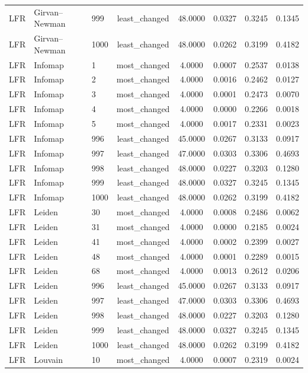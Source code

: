 \begin{longtable}{lllccccc}
LFR & Girvan--Newman & 999 & least\_changed & 48.0000 & 0.0327 & 0.3245 & 0.1345 \\
LFR & Girvan--Newman & 1000 & least\_changed & 48.0000 & 0.0262 & 0.3199 & 0.4182 \\
LFR & Infomap & 1 & most\_changed & 4.0000 & 0.0007 & 0.2537 & 0.0138 \\
LFR & Infomap & 2 & most\_changed & 4.0000 & 0.0016 & 0.2462 & 0.0127 \\
LFR & Infomap & 3 & most\_changed & 4.0000 & 0.0001 & 0.2473 & 0.0070 \\
LFR & Infomap & 4 & most\_changed & 4.0000 & 0.0000 & 0.2266 & 0.0018 \\
LFR & Infomap & 5 & most\_changed & 4.0000 & 0.0017 & 0.2331 & 0.0023 \\
LFR & Infomap & 996 & least\_changed & 45.0000 & 0.0267 & 0.3133 & 0.0917 \\
LFR & Infomap & 997 & least\_changed & 47.0000 & 0.0303 & 0.3306 & 0.4693 \\
LFR & Infomap & 998 & least\_changed & 48.0000 & 0.0227 & 0.3203 & 0.1280 \\
LFR & Infomap & 999 & least\_changed & 48.0000 & 0.0327 & 0.3245 & 0.1345 \\
LFR & Infomap & 1000 & least\_changed & 48.0000 & 0.0262 & 0.3199 & 0.4182 \\
LFR & Leiden & 30 & most\_changed & 4.0000 & 0.0008 & 0.2486 & 0.0062 \\
LFR & Leiden & 31 & most\_changed & 4.0000 & 0.0000 & 0.2185 & 0.0024 \\
LFR & Leiden & 41 & most\_changed & 4.0000 & 0.0002 & 0.2399 & 0.0027 \\
LFR & Leiden & 48 & most\_changed & 4.0000 & 0.0001 & 0.2289 & 0.0015 \\
LFR & Leiden & 68 & most\_changed & 4.0000 & 0.0013 & 0.2612 & 0.0206 \\
LFR & Leiden & 996 & least\_changed & 45.0000 & 0.0267 & 0.3133 & 0.0917 \\
LFR & Leiden & 997 & least\_changed & 47.0000 & 0.0303 & 0.3306 & 0.4693 \\
LFR & Leiden & 998 & least\_changed & 48.0000 & 0.0227 & 0.3203 & 0.1280 \\
LFR & Leiden & 999 & least\_changed & 48.0000 & 0.0327 & 0.3245 & 0.1345 \\
LFR & Leiden & 1000 & least\_changed & 48.0000 & 0.0262 & 0.3199 & 0.4182 \\
LFR & Louvain & 10 & most\_changed & 4.0000 & 0.0007 & 0.2319 & 0.0024 \\

\end{longtable}
